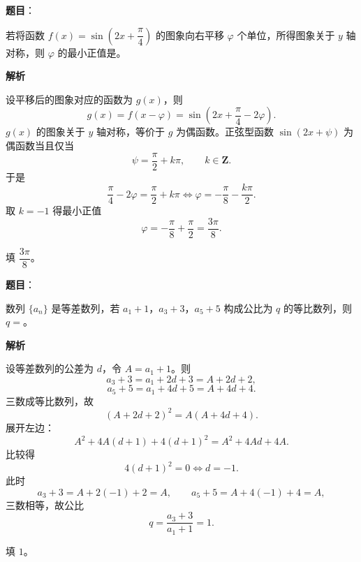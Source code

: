 \begin{answer}

\textbf{题目}：

若将函数 $f(x)=\sin\left(2x+\dfrac\pi4\right)$ 的图象向右平移 $\varphi$ 个单位，所得图象关于 $y$ 轴对称，则 $\varphi$ 的最小正值是\gkblank{}。

\textbf{解析}

设平移后的图象对应的函数为 $g(x)$，则
\nopagebreak[4]
\[g(x)=f(x-\varphi)=\sin\left(2x+\frac\pi4-2\varphi\right).\]
$g(x)$ 的图象关于 $y$ 轴对称，等价于 $g$ 为偶函数。正弦型函数 $\sin(2x+\psi)$ 为偶函数当且仅当
\nopagebreak[4]
\[\psi=\frac\pi2+k\pi,\qquad k\in\mathbf Z .\]
于是
\nopagebreak[4]
\[\frac\pi4-2\varphi=\frac\pi2+k\pi
\iff \varphi=-\frac\pi8-\frac{k\pi}2 .\]
取 $k=-1$ 得最小正值
\nopagebreak[4]
\[\varphi=-\frac\pi8+\frac\pi2=\frac{3\pi}8 .\]

填 $\dfrac{3\pi}8$。


\end{answer}
\begin{answer}

\textbf{题目}：

数列 $\{a_n\}$ 是等差数列，若 $a_1+1$，$a_3+3$，$a_5+5$ 构成公比为 $q$ 的等比数列，则 $q=$\gkblank{}。

\textbf{解析}

设等差数列的公差为 $d$，令 $A=a_1+1$。则
\nopagebreak[4]
\[a_3+3=a_1+2d+3=A+2d+2,\]
\nopagebreak[4]
\[a_5+5=a_1+4d+5=A+4d+4 .\]
三数成等比数列，故
\nopagebreak[4]
\[(A+2d+2)^2=A(A+4d+4).\]
展开左边：
\nopagebreak[4]
\[A^2+4A(d+1)+4(d+1)^2=A^2+4Ad+4A .\]
比较得
\nopagebreak[4]
\[4(d+1)^2=0\iff d=-1 .\]
此时
\nopagebreak[4]
\[a_3+3=A+2(-1)+2=A,\qquad a_5+5=A+4(-1)+4=A,\]
三数相等，故公比
\nopagebreak[4]
\[q=\frac{a_3+3}{a_1+1}=1 .\]

填 $1$。


\end{answer}
